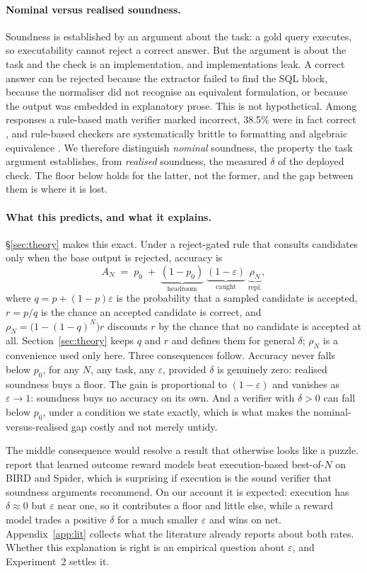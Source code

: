 \documentclass[11pt]{article}
\begin{document}
\paragraph{Nominal versus realised soundness.} Soundness is established by an argument about the task: a gold query executes, so executability cannot reject a correct answer. But the argument is about the task and the check is an implementation, and implementations leak. A correct answer can be rejected because the extractor failed to find the SQL block, because the normaliser did not recognise an equivalent formulation, or because the output was embedded in explanatory prose. This is not hypothetical. Among responses a rule-based math verifier marked incorrect, 38.5\% were in fact correct \citep{tinyv2025}, and rule-based checkers are systematically brittle to formatting and algebraic equivalence \citep{cai2025noisy}. We therefore distinguish \emph{nominal} soundness, the property the task argument establishes, from \emph{realised} soundness, the measured $\delta$ of the deployed check. The floor below holds for the latter, not the former, and the gap between them is where it is lost.

\paragraph{What this predicts, and what it explains.} \S\ref{sec:theory} makes this exact. Under a reject-gated rule that consults candidates only when the base output is rejected, accuracy is
\[
A_N \;=\; p_0 \;+\; \underbrace{(1-p_0)}_{\text{headroom}}\;\underbrace{(1-\varepsilon)}_{\text{caught}}\;\underbrace{\rho_N}_{\text{repl.}},
\]
where $q=p+(1-p)\varepsilon$ is the probability that a sampled candidate is accepted, $r=p/q$ is the chance an accepted candidate is correct, and $\rho_N=\bigl(1-(1-q)^N\bigr)r$ discounts $r$ by the chance that no candidate is accepted at all. Section~\ref{sec:theory} keeps $q$ and $r$ and defines them for general $\delta$; $\rho_N$ is a convenience used only here. Three consequences follow. Accuracy never falls below $p_0$, for any $N$, any task, any $\varepsilon$, provided $\delta$ is genuinely zero: realised soundness buys a floor. The gain is proportional to $(1-\varepsilon)$ and vanishes as $\varepsilon\to1$: soundness buys no accuracy on its own. And a verifier with $\delta>0$ can fall below $p_0$, under a condition we state exactly, which is what makes the nominal-versus-realised gap costly and not merely untidy.

The middle consequence would resolve a result that otherwise looks like a puzzle. \citet{gradesql2026} report that learned outcome reward models beat execution-based best-of-$N$ on BIRD and Spider, which is surprising if execution is the sound verifier that soundness arguments recommend. On our account it is expected: execution has $\delta\approx0$ but $\varepsilon$ near one, so it contributes a floor and little else, while a reward model trades a positive $\delta$ for a much smaller $\varepsilon$ and wins on net. Appendix~\ref{app:lit} collects what the literature already reports about both rates. Whether this explanation is right is an empirical question about $\varepsilon$, and Experiment~2 settles it.
\end{document}
